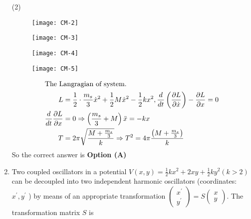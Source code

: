 \begin{enumerate}
\begin{tasks}(2)
\task[\textbf{A.}] \begin{figure}[H]
	\centering
	\texttt{[image: CM-2]}
\end{figure}
\task[\textbf{B.}] \begin{figure}[H]
	\centering
	\texttt{[image: CM-3]}
\end{figure}
\task[\textbf{C.}] \begin{figure}[H]
	\centering
	\texttt{[image: CM-4]}
\end{figure}
\task[\textbf{D.}] \begin{figure}[H]
	\centering
	\texttt{[image: CM-5]}
\end{figure}
\end{tasks}
\begin{answer}
\begin{align*}
\intertext{The Langragian of system.}
L&=\frac{1}{2} \cdot \frac{m_{s}}{3} \dot{x}^{2}+\frac{1}{2} M \dot{x}^{2}-\frac{1}{2} k x^{2}, \frac{d}{d t}\left(\frac{\partial L}{\partial \dot{x}}\right)-\frac{\partial L}{\partial x}=0\\
\frac{d}{d t} \frac{\partial L}{\partial x}&=0 \Rightarrow\left(\frac{m_{s}}{3}+M\right) \ddot{x}=-k x\\
T&=2 \pi \sqrt{\frac{M+\frac{m_{s}}{3}}{k}} \Rightarrow T^{2}=4 \pi \frac{\left(M+\frac{m_{s}}{3}\right)}{k}
\end{align*}
So the correct answer is \textbf{Option (A)}
\end{answer}
	\item Two coupled oscillators in a potential $V(x, y)=\frac{1}{2} k x^{2}+2 x y+\frac{1}{2} k y^{2}(k>2)$ can be decoupled into two independent harmonic oscillators (coordinates: $x^{\prime}, y^{\prime}$ ) by means of an appropriate transformation $\left(\begin{array}{c}x^{\prime} \\ y^{\prime}\end{array}\right)=S\left(\begin{array}{l}x \\ y\end{array}\right) .$ The transformation matrix $S$ is
	

\end{enumerate}
